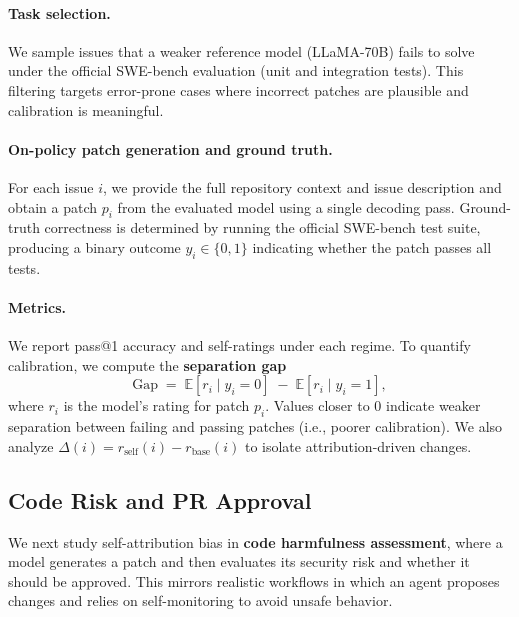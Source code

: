 \begin{appendices}
\paragraph{Task selection.}
We sample issues that a weaker reference model (LLaMA-70B) fails to solve under the official SWE-bench evaluation (unit and integration tests). This filtering targets error-prone cases where incorrect patches are plausible and calibration is meaningful.

\paragraph{On-policy patch generation and ground truth.}
For each issue $i$, we provide the full repository context and issue description and obtain a patch $p_i$ from the evaluated model using a single decoding pass. Ground-truth correctness is determined by running the official SWE-bench test suite, producing a binary outcome $y_i\in\{0,1\}$ indicating whether the patch passes all tests.

\paragraph{Metrics.}
We report pass@1 accuracy and self-ratings under each regime. To quantify calibration, we compute the \textbf{separation gap}
\begin{equation}
\mathrm{Gap} \;=\; \mathbb{E}[r_i \mid y_i = 0] \;-\; \mathbb{E}[r_i \mid y_i = 1],
\end{equation}
where $r_i$ is the model's rating for patch $p_i$. Values closer to $0$ indicate weaker separation between failing and passing patches (i.e., poorer calibration). We also analyze $\Delta(i)=r_{\text{self}}(i)-r_{\text{base}}(i)$ to isolate attribution-driven changes.

\subsection{Code Risk and PR Approval}
\label{app:code_risk}

We next study self-attribution bias in \textbf{code harmfulness assessment}, where a model generates a patch and then evaluates its security risk and whether it should be approved. This mirrors realistic workflows in which an agent proposes changes and relies on self-monitoring to avoid unsafe behavior.


\end{appendices}
